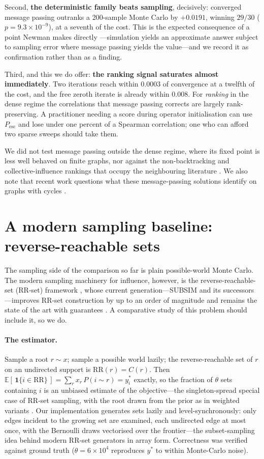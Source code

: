\documentclass[11pt,a4paper]{article}
\newcommand{\Pesc}{P_{\mathrm{esc}}}
\begin{document}
Second, \textbf{the deterministic family beats sampling}, decisively: converged
message passing outranks a 200-sample Monte Carlo by $+0.0191$, winning $29/30$
($p=9.3\times10^{-9}$), at a seventh of the cost. This is the expected
consequence of a point Newman makes directly \cite{newman23}---simulation yields
an approximate answer subject to sampling error where message passing yields the
value---and we record it as confirmation rather than as a finding.

Third, and this we do offer: \textbf{the ranking signal saturates almost
immediately}. Two iterations reach within $0.0003$ of convergence at a twelfth
of the cost, and the free zeroth iterate is already within $0.008$. For
\emph{ranking} in the dense regime the correlations that message passing corrects
are largely rank-preserving. A practitioner needing a score during operator
initialisation can use $\Pesc$ and lose under one percent of a Spearman
correlation; one who can afford two sparse sweeps should take them.

We did not test message passing outside the dense regime, where its fixed point
is less well behaved on finite graphs, nor against the non-backtracking and
collective-influence rankings that occupy the neighbouring literature
\cite{radicchi16,morone15}. We also note that recent work questions what these
message-passing solutions identify on graphs with cycles \cite{hiraoka26}.

\section{A modern sampling baseline: reverse-reachable sets}
\label{sec:rr}

The sampling side of the comparison so far is plain possible-world Monte
Carlo. The modern sampling machinery for influence, however, is the
reverse-reachable-set (RR-set) framework \cite{borgs14,tim14,imm15}, whose
current generation---SUBSIM and its successors---improves RR-set construction
by up to an order of magnitude and remains the state of the art with
guarantees \cite{guo20,guo22,li23survey}. A comparative study of this problem
should include it, so we do.

\paragraph{The estimator.} Sample a root $r\sim x$; sample a possible world
lazily; the reverse-reachable set of $r$ on an undirected support is
$\mathrm{RR}(r)=C(r)$. Then
$\mathbb{E}[\,\mathbf{1}\{i\in \mathrm{RR}\}\,]=\sum_r x_r\,P(i\sim r)=y^*_i$
exactly, so the fraction of $\theta$ sets containing $i$ is an unbiased
estimate of the objective---the singleton-spread special case of RR-set
sampling, with the root drawn from the prior as in weighted variants
\cite{kbtim15}. Our implementation generates sets lazily and
level-synchronously: only edges incident to the growing set are examined, each
undirected edge at most once, with the Bernoulli draws vectorised over the
frontier---the subset-sampling idea behind modern RR-set generators
\cite{guo20,guo22} in array form. Correctness was verified against ground
truth ($\theta=6\times10^4$ reproduces $y^*$ to within Monte-Carlo noise).
\end{document}
